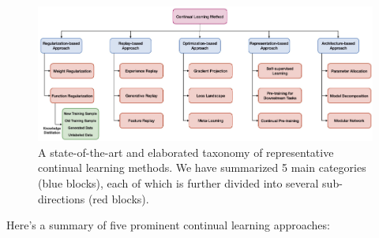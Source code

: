 \documentclass[12pt,a4paper]{article}
\begin{document}
\begin{figure}[!htb]
	\centering
	\includegraphics[width=0.8\linewidth]{assets/methods}
	\caption{A state-of-the-art and elaborated taxonomy of representative continual learning methods. We have summarized 5 main categories (blue	blocks), each of which is further divided into several sub-directions (red blocks). \cite{contlearning}}
	\label{fig:methods}
\end{figure}
 

Here's a summary of five prominent continual learning approaches:
\end{document}
